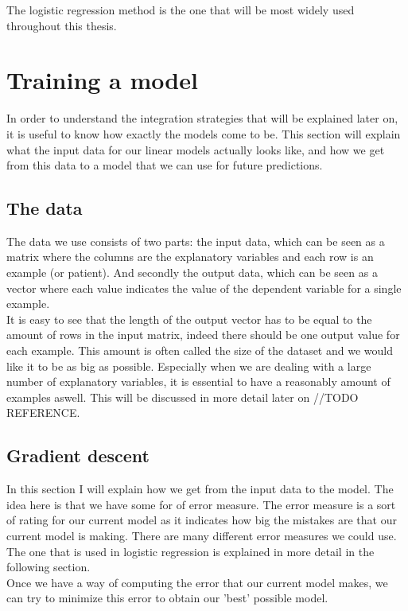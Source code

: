 The logistic regression method is the one that will be most widely used throughout this thesis.

\section{Training a model}
In order to understand the integration strategies that will be explained later on, it is useful to know how exactly the models come to be. This section will explain what the input data for our linear models actually looks like, and how we get from this data to a model that we can use for future predictions.
\subsection{The data}
The data we use consists of two parts: the input data, which can be seen as a matrix where the columns are the explanatory variables and each row is an example (or patient). And secondly the output data, which can be seen as a vector where each value indicates the value of the dependent variable for a single example. \\
It is easy to see that the length of the output vector has to be equal to the amount of rows in the input matrix, indeed there should be one output value for each example. This amount is often called the size of the dataset and we would like it to be as big as possible. Especially when we are dealing with a large number of explanatory variables, it is essential to have a reasonably amount of examples aswell. This will be discussed in more detail later on //TODO REFERENCE. 

\subsection{Gradient descent}
In this section I will explain how we get from the input data to the model. The idea here is that we have some for of error measure. The error measure is a sort of rating for our current model as it indicates how big the mistakes are that our current model is making. There are many different error measures we could use. The one that is used in logistic regression is explained in more detail in the following section. \\
Once we have a way of computing the error that our current model makes, we can try to minimize this error to obtain our 'best' possible model.
